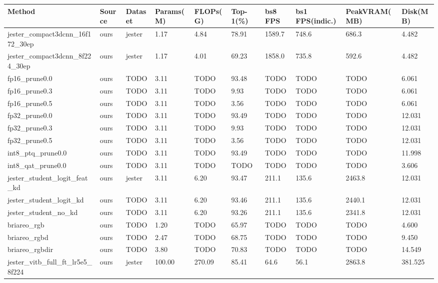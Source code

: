 \begin{tabular}{llllllllll}
\hline
Method & Source & Dataset & Params(M) & FLOPs(G) & Top-1(\%) & bs8 FPS & bs1 FPS(indic.) & PeakVRAM(MB) & Disk(MB) \\
\hline
jester\_compact3dcnn\_16f172\_30ep & ours & jester & 1.17 & 4.84 & 78.91 & 1589.7 & 748.6 & 686.3 & 4.482 \\
jester\_compact3dcnn\_8f224\_30ep & ours & jester & 1.17 & 4.01 & 69.23 & 1858.0 & 735.8 & 592.6 & 4.482 \\
fp16\_prune0.0 & ours & TODO & 3.11 & TODO & 93.48 & TODO & TODO & TODO & 6.061 \\
fp16\_prune0.3 & ours & TODO & 3.11 & TODO & 9.93 & TODO & TODO & TODO & 6.061 \\
fp16\_prune0.5 & ours & TODO & 3.11 & TODO & 3.56 & TODO & TODO & TODO & 6.061 \\
fp32\_prune0.0 & ours & TODO & 3.11 & TODO & 93.49 & TODO & TODO & TODO & 12.031 \\
fp32\_prune0.3 & ours & TODO & 3.11 & TODO & 9.93 & TODO & TODO & TODO & 12.031 \\
fp32\_prune0.5 & ours & TODO & 3.11 & TODO & 3.56 & TODO & TODO & TODO & 12.031 \\
int8\_ptq\_prune0.0 & ours & TODO & 3.11 & TODO & 93.49 & TODO & TODO & TODO & 11.998 \\
int8\_qat\_prune0.0 & ours & TODO & 3.11 & TODO & TODO & TODO & TODO & TODO & 3.606 \\
jester\_student\_logit\_feat\_kd & ours & jester & 3.11 & 6.20 & 93.47 & 211.1 & 135.6 & 2463.8 & 12.031 \\
jester\_student\_logit\_kd & ours & TODO & 3.11 & 6.20 & 93.46 & 211.1 & 135.6 & 2440.1 & 12.031 \\
jester\_student\_no\_kd & ours & TODO & 3.11 & 6.20 & 93.26 & 211.1 & 135.6 & 2341.8 & 12.031 \\
briareo\_rgb & ours & TODO & 1.20 & TODO & 65.97 & TODO & TODO & TODO & 4.600 \\
briareo\_rgbd & ours & TODO & 2.47 & TODO & 68.75 & TODO & TODO & TODO & 9.450 \\
briareo\_rgbdir & ours & TODO & 3.80 & TODO & 70.83 & TODO & TODO & TODO & 14.549 \\
jester\_vitb\_full\_ft\_lr5e5\_8f224 & ours & jester & 100.00 & 270.09 & 85.41 & 64.6 & 56.1 & 2863.8 & 381.525 \\

\end{tabular}
